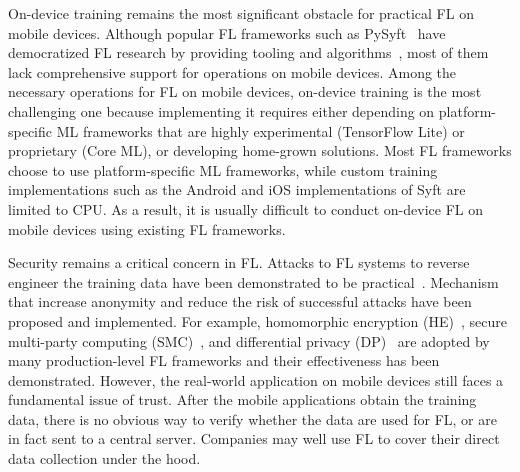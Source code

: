 \documentclass[conference]{IEEEtran}
\begin{document}

On-device training remains the most significant obstacle for
practical FL on mobile devices.
Although popular FL frameworks such as
PySyft~\cite{ryffel2018generic,Ziller2021,hall2021syft}
have democratized FL research by providing tooling and
algorithms~\cite{sriraman2022device},
most of them lack comprehensive support for operations on mobile devices.
Among the necessary operations for FL on mobile devices,
on-device training is the most challenging one because
implementing it requires either depending on
platform-specific ML frameworks that are highly experimental (TensorFlow Lite)
or proprietary (Core ML),
or developing home-grown solutions.
Most FL frameworks choose to use platform-specific ML frameworks,
while custom training implementations such as
the Android and iOS implementations of Syft are limited to CPU.
As a result, it is usually difficult to conduct on-device FL
on mobile devices using existing FL frameworks.

Security remains a critical concern in FL.
Attacks to FL systems to reverse engineer the training data have been
demonstrated to be practical~\cite{sun2019really}.
Mechanism that increase anonymity and
reduce the risk of successful attacks have been proposed and implemented.
For example,
homomorphic encryption (HE)~\cite{wang2020homo},
secure multi-party computing (SMC)~\cite{bonawitz2016practical}, and
differential privacy
(DP)~\cite{dwork2006differential,geyer2017differentially} are
adopted by many production-level FL frameworks and
their effectiveness has been demonstrated.
However, the real-world application on mobile devices still faces a fundamental
issue of trust.
After the mobile applications obtain the training data,
there is no obvious way to verify whether the data are used for FL,
or are in fact sent to a central server.
Companies may well use FL to cover their direct data collection under the hood.

\printbibliography

\end{document}
